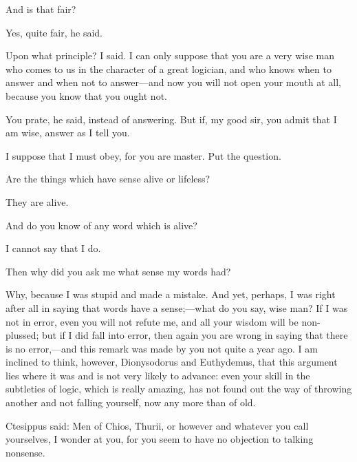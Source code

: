 \documentclass[11pt,letter]{article}
\begin{document}
\par  And is that fair?

\par  Yes, quite fair, he said.

\par  Upon what principle? I said. I can only suppose that you are a very wise man who comes to us in the character of a great logician, and who knows when to answer and when not to answer—and now you will not open your mouth at all, because you know that you ought not.

\par  You prate, he said, instead of answering. But if, my good sir, you admit that I am wise, answer as I tell you.

\par  I suppose that I must obey, for you are master. Put the question.

\par  Are the things which have sense alive or lifeless?

\par  They are alive.

\par  And do you know of any word which is alive?

\par  I cannot say that I do.

\par  Then why did you ask me what sense my words had?

\par  Why, because I was stupid and made a mistake. And yet, perhaps, I was right after all in saying that words have a sense;—what do you say, wise man? If I was not in error, even you will not refute me, and all your wisdom will be non-plussed; but if I did fall into error, then again you are wrong in saying that there is no error,—and this remark was made by you not quite a year ago. I am inclined to think, however, Dionysodorus and Euthydemus, that this argument lies where it was and is not very likely to advance: even your skill in the subtleties of logic, which is really amazing, has not found out the way of throwing another and not falling yourself, now any more than of old.

\par  Ctesippus said: Men of Chios, Thurii, or however and whatever you call yourselves, I wonder at you, for you seem to have no objection to talking nonsense.
\end{document}
